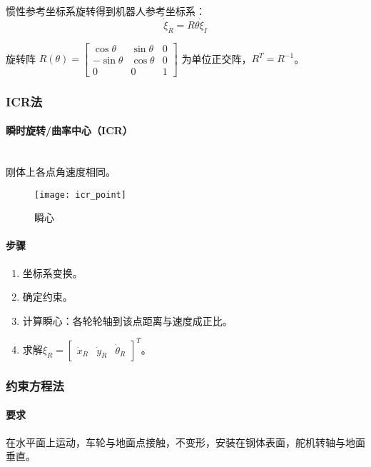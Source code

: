 \documentclass[
12pt, %
a4paper, 
oneside, %
headinclude,footinclude, %
]{scrartcl}
\begin{document}
惯性参考坐标系旋转得到机器人参考坐标系：
$$ \dot{\xi}_R = R\theta \dot{\xi}_I $$

旋转阵
$ R(\theta) = \begin{bmatrix} \cos\theta & \sin\theta & 0 \\ -\sin\theta & \cos\theta & 0 \\ 0 & 0 & 1 \end{bmatrix} $
为单位正交阵，$ R^T = R^{-1} $。
\subsubsection[ICR法]{ICR法}
\begin{minipage}{0.35\textwidth}
\paragraph{瞬时旋转/曲率中心（ICR）}~\\
刚体上各点角速度相同。
\begin{figure}[H]
\centering 
\texttt{[image: icr\_point]} 
\caption[瞬心]{瞬心}
\end{figure}
\end{minipage}
\hfill
\begin{minipage}{0.6\textwidth}
\paragraph{步骤}
\begin{enumerate}
\item 坐标系变换。
\item 确定约束。
\item 计算瞬心：各轮轮轴到该点距离与速度成正比。
\item 求解$ \xi_R = \begin{bmatrix} \dot{x}_R & \dot{y}_R & \dot{\theta}_R \end{bmatrix}^T $。
\end{enumerate}
\end{minipage}
\subsubsection[约束方程法]{约束方程法}
\paragraph{要求}
在水平面上运动，车轮与地面点接触，不变形，安装在钢体表面，舵机转轴与地面垂直。
\end{document}
